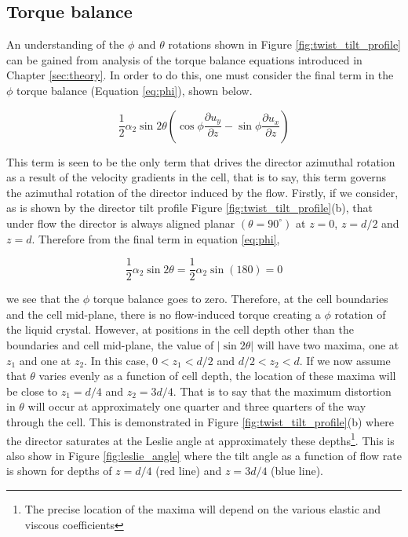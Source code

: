 \subsection{Torque balance}
An understanding of the $\phi$ and $\theta$ rotations shown in Figure \ref{fig:twist_tilt_profile} can be gained from analysis of the torque balance equations introduced in Chapter \ref{sec:theory}. In order to do this, one must consider the final term in the $\phi$ torque balance (Equation \ref{eq:phi}), shown below.

\begin{equation}
\frac{1}{2}\alpha_2\sin2\theta\left(\cos\phi\frac{\partial u_y}{\partial z}-\sin\phi\frac{\partial u_x}{\partial z}\right)
\end{equation}

This term is seen to be the only term that drives the director azimuthal rotation as a result of the velocity gradients in the cell, that is to say, this term governs the azimuthal rotation of the director induced by the flow. Firstly, if we consider, as is shown by the director tilt profile Figure \ref{fig:twist_tilt_profile}(b), that under flow the director is always aligned planar $\left(\theta=90^{\circ}\right)$ at $z=0$, $z=d/2$ and $z=d$. Therefore from the final term in equation \ref{eq:phi},

\begin{equation}
\frac{1}{2}\alpha_2\sin2\theta=\frac{1}{2}\alpha_2\sin(180)=0
\end{equation}

we see that the $\phi$ torque balance goes to zero. Therefore, at the cell boundaries and the cell mid-plane, there is no flow-induced torque creating a $\phi$ rotation of the liquid crystal. However, at positions in the cell depth other than the boundaries and cell mid-plane, the value of $|\sin2\theta|$ will have two maxima, one at $z_1$ and one at $z_2$. In this case, $0<z_1<d/2$ and $d/2<z_2<d$. If we now assume that $\theta$ varies evenly as a function of cell depth, the location of these maxima will be close to $z_1=d/4$ and $z_2=3d/4$. That is to say that the maximum distortion in $\theta$ will occur at approximately one quarter and three quarters of the way through the cell. This is demonstrated in Figure \ref{fig:twist_tilt_profile}(b) where the director saturates at the Leslie angle at approximately these depths\footnote{The precise location of the maxima will depend on the various elastic and viscous coefficients}. This is also show in Figure \ref{fig:leslie_angle} where the tilt angle as a function of flow rate is shown for depths of $z=d/4$ (red line) and $z=3d/4$ (blue line).

